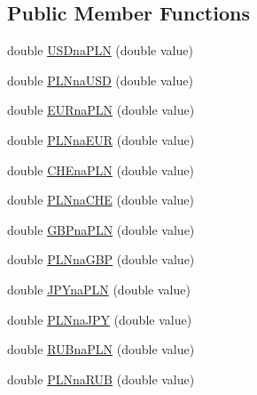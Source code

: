 \subsection*{Public Member Functions}
\begin{DoxyCompactItemize}
\item 
double \hyperlink{classkantor_1_1com_1_1web_1_1service_1_1_kantor_przelicz_ad263683559db773d4ccb28e14090824f}{U\+S\+Dna\+P\+L\+N} (double value)
\item 
double \hyperlink{classkantor_1_1com_1_1web_1_1service_1_1_kantor_przelicz_aea3a5dd74cf10d0c9ce1bf04b94078c8}{P\+L\+Nna\+U\+S\+D} (double value)
\item 
double \hyperlink{classkantor_1_1com_1_1web_1_1service_1_1_kantor_przelicz_af204b150c62165c836a1a0afd10c16b7}{E\+U\+Rna\+P\+L\+N} (double value)
\item 
double \hyperlink{classkantor_1_1com_1_1web_1_1service_1_1_kantor_przelicz_acfc0cd42fb64c5f26d468245cf0fe3b6}{P\+L\+Nna\+E\+U\+R} (double value)
\item 
double \hyperlink{classkantor_1_1com_1_1web_1_1service_1_1_kantor_przelicz_acff8492d50d84cf718bca4c8b499d36a}{C\+H\+Ena\+P\+L\+N} (double value)
\item 
double \hyperlink{classkantor_1_1com_1_1web_1_1service_1_1_kantor_przelicz_afa953802446690d409e1df5361729fc0}{P\+L\+Nna\+C\+H\+E} (double value)
\item 
double \hyperlink{classkantor_1_1com_1_1web_1_1service_1_1_kantor_przelicz_a64b58db5e686a08b4b1af648eb781a1c}{G\+B\+Pna\+P\+L\+N} (double value)
\item 
double \hyperlink{classkantor_1_1com_1_1web_1_1service_1_1_kantor_przelicz_ad0840077798f333f948772590d1a402a}{P\+L\+Nna\+G\+B\+P} (double value)
\item 
double \hyperlink{classkantor_1_1com_1_1web_1_1service_1_1_kantor_przelicz_a9e6f2e71874e1dd7b520d2da4427bae8}{J\+P\+Yna\+P\+L\+N} (double value)
\item 
double \hyperlink{classkantor_1_1com_1_1web_1_1service_1_1_kantor_przelicz_a7706e3a08c1b8ce3775506c4530d1bf7}{P\+L\+Nna\+J\+P\+Y} (double value)
\item 
double \hyperlink{classkantor_1_1com_1_1web_1_1service_1_1_kantor_przelicz_a11c3958baf84a3a96dbc9290890b6c4e}{R\+U\+Bna\+P\+L\+N} (double value)
\item 
double \hyperlink{classkantor_1_1com_1_1web_1_1service_1_1_kantor_przelicz_ad68cbeb18f18cd02c3b4b571da0e06fa}{P\+L\+Nna\+R\+U\+B} (double value)
\item 

\end{DoxyCompactItemize}

